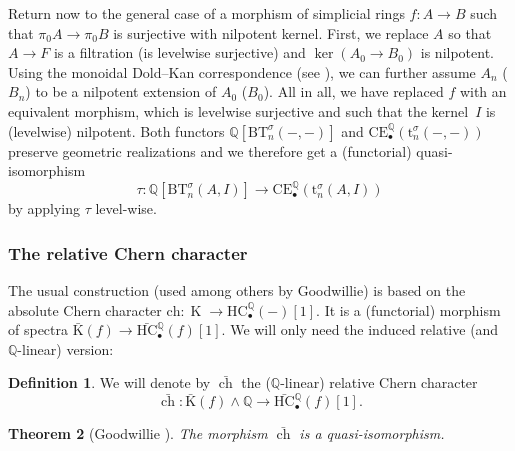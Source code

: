 \documentclass[JEP,XML,SOM,Unicode,NoEqCountersInSection]{cedram}
\let\widebar\bar
\newcommand{\sbullet}{{\scriptscriptstyle\bullet}}
\newtheorem{thm}{Theorem}[subsection]
\theoremstyle{definition}
\newtheorem{df}[thm]{Definition}
\newcommand{\Q}{\mathbb{Q}}
\DeclareMathOperator{\K}{K}
\newcommand{\B}{\mathrm{B}}
\newcommand{\bch}{\widebar{\operatorname{ch}}}
\newcommand{\bK}{\widebar{\mathrm{K}}}
\newcommand{\HC}{\mathrm{HC}}
\newcommand{\bHC}{\widebar{\mathrm{HC}}{}}
\newcommand{\CE}{\mathrm{CE}}
\begin{document}
Return now to the general case of a morphism of simplicial rings $f \colon A \to B$ such that $\pi_0 A \to \pi_0 B$ is surjective with nilpotent kernel. First, we replace $A$ so that $A \to F$ is a filtration (\ie is levelwise surjective) and $\ker(A_0 \to B_0)$ is nilpotent. Using the monoidal Dold--Kan correspondence (see \cite{schwedeshipley:monoidalDK}), we can further assume $A_n$ (\resp $B_n$) to be a nilpotent extension of $A_0$ (\resp $B_0$). All in all, we have replaced $f$ with an equivalent morphism, which is levelwise surjective and such that the kernel~$I$ is (levelwise) nilpotent.
Both functors $\Q[\B \mathrm{T}^\sigma_n(-,-)]$ and $\CE_\sbullet^\Q(\mathrm{t}^\sigma_n(-,-))$ preserve geometric realizations and we therefore get a (functorial) quasi-isomorphism
\[
\tau \colon \Q[\B \mathrm{T}^\sigma_n(A,I)] \to \CE_\sbullet^\Q(\mathrm{t}^\sigma_n(A,I))
\]
by applying $\tau$ level-wise.

\subsubsection{The relative Chern character}\label{par:chern}
The usual construction (used among others by Goodwillie) is based on the absolute Chern character $\mathrm{ch} \colon \K \to \HC^\Q_\sbullet(-)[1]$. It is a (functorial) morphism of spectra $\bK(f) \to \bHC_\sbullet^\Q(f)[1]$. We will only need the induced relative (and $\Q$-linear) version:

\begin{df}
We will denote by $\bch$ the ($\Q$-linear) relative Chern character
\[
\bch \colon \bK(f) \wedge \Q \to \bHC_\sbullet^\Q(f)[1].
\]
\end{df}

\begin{thm}[Goodwillie \cite{goodwillie:tangentk}]\label{thm:goodwillie}
The morphism $\bch$ is a quasi-isomorphism.
\end{thm}
\end{document}
